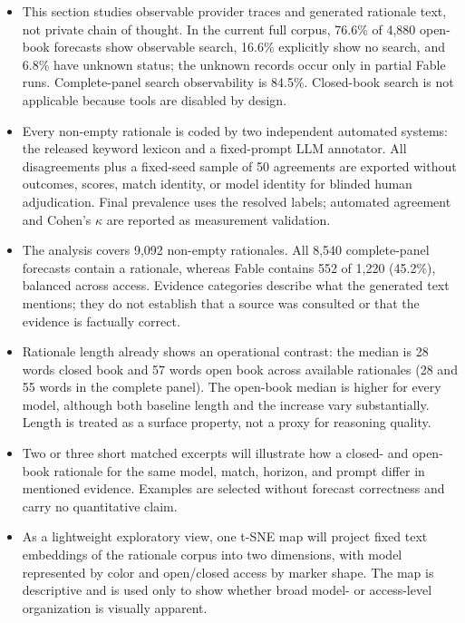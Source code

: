 \documentclass[sigconf,review]{acmart}
\newenvironment{draftbullets}
  {\begin{itemize}[leftmargin=1.25em,itemsep=1.5pt,topsep=2pt,parsep=0pt,partopsep=0pt]}
  {\end{itemize}}
\begin{document}
\begin{draftbullets}
  \item This section studies observable provider traces and generated rationale text, not private
  chain of thought. In the current full corpus, 76.6\% of 4,880 open-book forecasts show observable
  search, 16.6\% explicitly show no search, and 6.8\% have unknown status; the unknown records occur
  only in partial Fable runs. Complete-panel search observability is 84.5\%. Closed-book search is
  not applicable because tools are disabled by design.

  \item Every non-empty rationale is coded by two independent automated systems: the released keyword
  lexicon and a fixed-prompt LLM annotator. All disagreements plus a fixed-seed sample of 50 agreements
  are exported without outcomes, scores, match identity, or model identity for blinded human
  adjudication. Final prevalence uses the resolved labels; automated agreement and Cohen's $\kappa$
  are reported as measurement validation.

  \item The analysis covers 9,092 non-empty rationales. All 8,540 complete-panel forecasts contain a
  rationale, whereas Fable contains 552 of 1,220 (45.2\%), balanced across access. Evidence categories
  describe what the generated text mentions; they do not establish that a source was consulted or
  that the evidence is factually correct.

  \item Rationale length already shows an operational contrast: the median is 28 words closed book
  and 57 words open book across available rationales (28 and 55 words in the complete panel). The
  open-book median is higher for every model, although both baseline length and the increase vary
  substantially. Length is treated as a surface property, not a proxy for reasoning quality.

  \item Two or three short matched excerpts will illustrate how a closed- and open-book rationale for
  the same model, match, horizon, and prompt differ in mentioned evidence. Examples are selected
  without forecast correctness and carry no quantitative claim.

  \item As a lightweight exploratory view, one t-SNE map will project fixed text embeddings of the
  rationale corpus into two dimensions, with model represented by color and open/closed access by
  marker shape. The map is descriptive and is used only to show whether broad model- or access-level
  organization is visually apparent.
\end{draftbullets}
\end{document}
